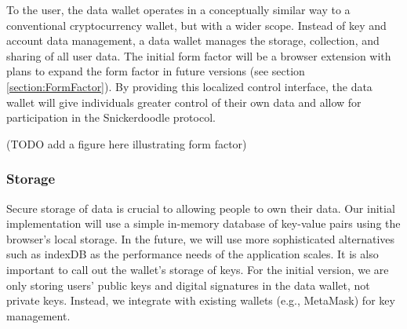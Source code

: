 


To the user, the data wallet operates in a conceptually similar way to a conventional cryptocurrency wallet, but with a wider scope. Instead of key and account data management, a data wallet manages the storage, collection, and sharing of all user data. The initial form factor will be a browser extension with plans to expand the form factor in future versions (see section \ref{section:FormFactor}). By providing this localized control interface, the data wallet will give individuals greater control of their own data and allow for participation in the Snickerdoodle protocol.

(TODO add a figure here illustrating form factor)


\subsubsection{Storage}
Secure storage of data is crucial to allowing people to own their data. Our initial implementation will use a simple in-memory database of key-value pairs using the browser's local storage. In the future, we will use more sophisticated alternatives such as indexDB as the performance needs of the application scales. It is also important to call out the wallet's storage of keys. For the initial version, we are only storing users' public keys and digital signatures in the data wallet, not private keys. Instead, we integrate with existing wallets (e.g., MetaMask) for key management.


